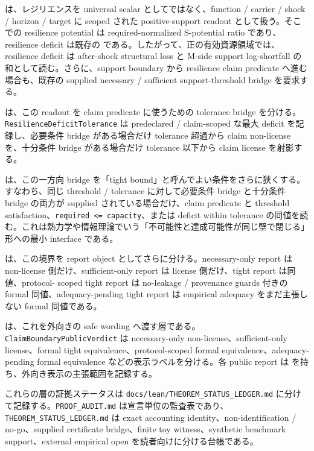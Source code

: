 \documentclass[12pt,a4paper]{article}
\begin{document}
{\scriptsize{}} は、レジリエンスを universal scalar としてではなく、function / carrier / shock / horizon / target に scoped された positive-support readout として扱う。そこでの resilience potential は required-normalized S-potential ratio であり、resilience deficit は既存の {\scriptsize{}} である。したがって、正の有効資源領域では、resilience deficit は after-shock structural loss と M-side support log-shortfall の和として読む。さらに、support boundary から resilience claim predicate へ進む場合も、既存の supplied necessary / sufficient support-threshold bridge を要求する。

{\scriptsize{}} は、この readout を claim predicate に使うための tolerance bridge を分ける。\texttt{ResilienceDeficitTolerance} は predeclared / claim-scoped な最大 deficit を記録し、必要条件 bridge がある場合だけ tolerance 超過から claim non-license を、十分条件 bridge がある場合だけ tolerance 以下から claim license を射影する。

{\scriptsize{}} は、この一方向 bridge を「tight bound」と呼んでよい条件をさらに狭くする。すなわち、同じ threshold / tolerance に対して必要条件 bridge と十分条件 bridge の両方が supplied されている場合だけ、claim predicate と threshold satisfaction、\texttt{required\ \textless{}=\ capacity}、または deficit within tolerance の同値を読む。これは熱力学や情報理論でいう「不可能性と達成可能性が同じ壁で閉じる」形への最小 interface である。

{\scriptsize{}} は、この境界を report object としてさらに分ける。necessary-only report は non-license 側だけ、sufficient-only report は license 側だけ、tight report は同値、protocol- scoped tight report は no-leakage / provenance guards 付きの formal 同値、adequacy-pending tight report は empirical adequacy をまだ主張しない formal 同値である。

{\scriptsize{}} は、これを外向きの safe wording へ渡す層である。\texttt{ClaimBoundaryPublicVerdict} は necessary-only non-license、sufficient-only license、formal tight equivalence、protocol-scoped formal equivalence、adequacy-pending formal equivalence などの表示ラベルを分ける。各 public report は {\scriptsize{}} を持ち、外向き表示の主張範囲を記録する。

これらの層の証拠ステータスは \texttt{docs/lean/THEOREM\_STATUS\_LEDGER.md} に分けて記録する。\texttt{PROOF\_AUDIT.md} は宣言単位の監査表であり、\texttt{THEOREM\_STATUS\_LEDGER.md} は exact accounting identity、non-identification / no-go、supplied certificate bridge、finite toy witness、synthetic benchmark support、external empirical open を読者向けに分ける台帳である。
\end{document}
